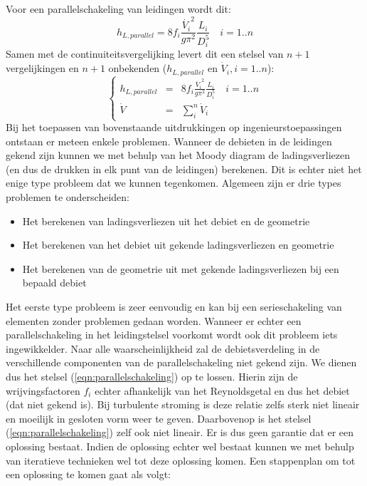 Voor een parallelschakeling van leidingen wordt dit:
\begin{equation}
	h_{L,parallel} = 8 f_i \frac{\dot{V_i}^2}{g \pi^2} \frac{L_i}{D^5_i} \quad i=1..n
\end{equation}
Samen met de continuiteitsvergelijking levert dit een stelsel van $n+1$ vergelijkingen en $n+1$ onbekenden ($h_{L,parallel}$ en $\dot{V}_i, i=1..n$):
\begin{equation}
	\left\{
	\begin{array}{lcl}
		h_{L,parallel} &=& 8 f_i \frac{\dot{V_i}^2}{g \pi^2} \frac{L_i}{D^5_i} \quad i=1..n \\
		\dot{V} &=& \sum_i^n \dot{V}_i
	\end{array}
	\right.
	\label{eqn:parallelschakeling}
\end{equation}
\npar
Bij het toepassen van bovenstaande uitdrukkingen op ingenieurstoepassingen ontstaan er meteen enkele problemen. Wanneer de debieten in de leidingen gekend zijn kunnen we met behulp van het Moody diagram de ladingsverliezen (en dus de drukken in elk punt van de leidingen) berekenen. Dit is echter niet het enige type probleem dat we kunnen tegenkomen. Algemeen zijn er drie types problemen te onderscheiden:
\begin{itemize}
	\item Het berekenen van ladingsverliezen uit het debiet en de geometrie
	\item Het berekenen van het debiet uit gekende ladingsverliezen en geometrie
	\item Het berekenen van de geometrie uit met gekende ladingsverliezen bij een bepaald debiet
\end{itemize}
Het eerste type probleem is zeer eenvoudig en kan bij een serieschakeling van elementen zonder problemen gedaan worden. Wanneer er echter een parallelschakeling in het leidingstelsel voorkomt wordt ook dit probleem iets ingewikkelder. Naar alle waarscheinlijkheid zal de debietsverdeling in de verschillende componenten van de parallelschakeling niet gekend zijn. We dienen dus het stelsel (\ref{eqn:parallelschakeling}) op te lossen. Hierin zijn de wrijvingsfactoren $f_i$ echter afhankelijk van het Reynoldsgetal en dus het debiet (dat niet gekend is). Bij turbulente stroming is deze relatie zelfs sterk niet lineair en moeilijk in gesloten vorm weer te geven. Daarbovenop is het stelsel (\ref{eqn:parallelschakeling}) zelf ook niet lineair. Er is dus geen garantie dat er een oplossing bestaat.
Indien de oplossing echter wel bestaat kunnen we met behulp van iteratieve technieken wel tot deze oplossing komen. Een stappenplan om tot een oplossing te komen gaat als volgt:
